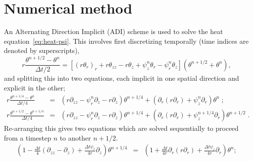 \documentclass[11pt]{proc}
\begin{document}
\newpage
{}
\begin{appendices}

\label{appendix}


  \section{Numerical method}
\label{app:numerical-method}
An Alternating Direction Implicit (ADI) scheme is used to solve the heat equation~\eqref{eq:heat-psi}. This involves first discretizing temporally (time indices are denoted by superscripts),
\begin{equation}
r  \frac{\theta^{n+1/2} - \theta^n}{\Delta t / 2} = \left[ (r \theta_r)_r + r \theta_{zz} - r \theta_z + \psi^n_z \theta_r - \psi^n_r \theta_z \right] \left( \theta^{n+1/2} + \theta^n \right),
\end{equation}
and splitting this into two equations, each implicit in one spatial direction and explicit in the other;
\begin{eqnarray}
r \frac{\theta^{n+1/4} - \theta^n}{\Delta t / 4} &=& \left(  r \partial_{zz} -  \psi_r^n \partial_z - r \partial_z   \right) \theta^{n+1/4} + \left(  \partial_r (r \partial_r) +   \psi_z^n \partial_r    \right) \theta^{n} \; ;  \\
r \frac{\theta^{n+1/2} - \theta^{n+1/4}}{\Delta t / 4} &=&\left(  r \partial_{zz} -  \psi_r^n \partial_z - r \partial_z   \right) \theta^{n+1/4}   +   \left(  \partial_r (r \partial_r) +   \psi_z^{n+1/4} \partial_r    \right) \theta^{n+1/2}  \;   .   
\end{eqnarray}
Re-arranging this gives two equations which are solved sequentially to proceed from a timestep $n$ to another $n+1/2$.
\begin{eqnarray}
\left( 1 - \frac{\Delta t}{4} (\partial_{zz}-\partial_z) + \frac{\Delta t \psi_r}{4 r} \partial_z \right) \theta^{n+1/4} &=& \left(1 + \frac{\Delta t}{4 r} \partial_r (r \partial_r) + \frac{\Delta t \psi_z}{4 r} \partial_r \right) \theta^n  ; \label{eq:theta-ADI1}\\

\end{eqnarray}
\end{appendices}
\end{document}
